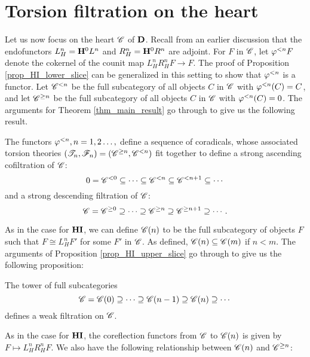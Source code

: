 \section{Torsion filtration on the heart}

Let us now focus on the heart $\Cat{C}$ of $\DCat$. Recall from
an earlier discussion that the endofunctors $L_H^n = \HH^0 L^n$ 
and $R_H^n = \HH^0 R^n$ are adjoint. For $F$ in $\Cat{C}$, let 
$\corad{n} F$ denote the cokernel of the counit map $L_H^n R_H^n 
F \to F$. The proof of Proposition \ref{prop_HI_lower_slice} can be 
generalized in this setting to show that $\corad{n}$ is a functor. 
Let $\Corad{n}{\Cat{C}}$ be the full subcategory of all objects 
$C$ in $\Cat{C}$ with $\corad{n}(C) = C$, and let 
$\Prerad{n}{\Cat{C}}$ be the full subcategory of all objects $C$ 
in $\Cat{C}$ with $\corad{n}(C) = 0$. The arguments for Theorem 
\ref{thm_main_result} go through to give us the following result. 

\begin{thm}\label{thm_sum_heart}
The functors $\corad{n}, n = 1, 2\dots,$ define a sequence of
coradicals, whose associated torsion theories $(\Cat{T}_n,
\Cat{F}_n) = (\Prerad{n}{\Cat{C}}, \Corad{n}{\Cat{C}})$ fit together
to define a strong ascending cofiltration of $\Cat{C}$:
\[
0 = \Corad{0}{\Cat{C}} \subseteq \cdots \subseteq \Corad{n}{\Cat{C}}
   \subseteq \Corad{n + 1}{\Cat{C}} \subseteq \cdots
\]
and a strong descending filtration of $\Cat{C}$:
\[
\Cat{C} = \Prerad{0}{\Cat{C}} \supseteq \cdots \supseteq \Prerad{n}{\Cat{C}}
\supseteq \Prerad{n + 1}{\Cat{C}} \supseteq \cdots.
\]
\end{thm}

As in the case for $\HI$, we can define $\SGFilt{n}{\Cat{C}}$ to be
the full subcategory of objects $F$ such that $F \cong L_H^nF'$
for some $F'$ in $\Cat{C}$. As defined, $\SGFilt{n}{\Cat{C}}
\subseteq \SGFilt{m}{\Cat{C}}$ if $n < m$. The arguments of 
Proposition \ref{prop_HI_upper_slice} go through to give us the 
following proposition:

\begin{prop}
The tower of full subcategories
\[
\Cat{C} = \SGFilt{0}{\Cat{C}} \supseteq \cdots \supseteq \SGFilt{n - 1}{\Cat{C}}
\supseteq \SGFilt{n}{\Cat{C}} \supseteq \cdots
\]
defines a weak filtration on $\Cat{C}$.
\end{prop}

As in the case for $\HI$, the coreflection functors from $\Cat{C}$ 
to $\SGFilt{n}{\Cat{C}}$ is given by $F \mapsto L_H^n R_H^n F$. We 
also have the following relationship between $\SGFilt{n}{\Cat{C}}$ 
and $\Prerad{n}{\Cat{C}}$:

